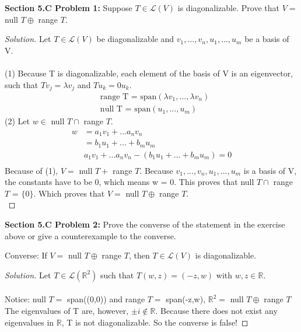 \documentclass[12pt]{article}
\begin{document}
\noindent \textbf{Section 5.C Problem 1: }Suppose $T \in \mathcal{L}(V)$ is diagonalizable. Prove that $V = $ null $T \oplus$ range $T$.
	\begin{proof}[Solution]
		Let $T \in \mathcal{L}(V)$ be diagonalizable and $v_1, ..., v_n, u_1 , ...,u_m$ be a basis of V.  
		\\ \\
		(1) Because T is diagonalizable, each element of the basis of V is an eigenvector, such that $Tv_j = \lambda v_j$ and $Tu_k = 0 u_k$.  
		\begin{align*}
			&\text{range T = span}(\lambda v_1 , ... , \lambda v_n) \\
			&\text{null T = span}(u_1 , ... , u_m) 
		\end{align*}
		(2) Let $w \in $ null $T \cap$ range $T$. 
		\begin{align*}
			w &= a_1 v_1 + ... a_n v_n \\
			&= b_1 u_1 + ... + b_m u_m \\
			&a_1 v_1 + ... a_n v_n - (b_1 u_1 + ... + b_m u_m) = 0 \\
		\end{align*}
		Because of (1), $V =$ null $T +$ range $T$. Because $v_1, ..., v_n, u_1 , ...,u_m$ is a basis of V, the constants have to be 0, which means w = 0.  This proves that null $T \cap$ range $T$ = $\{0\}$.  Which proves that $V = $ null $T \oplus$ range $T$. \\ 
	\end{proof}
\newpage

\noindent \textbf{Section 5.C Problem 2: }Prove the converse of the statement in the exercise above or give a
counterexample to the converse.
	\begin{center}
		Converse: If $V = $ null $T \oplus$ range $T$, then $T \in \mathcal{L}(V)$ is diagonalizable.
	\end{center}
	\begin{proof}[Solution]
		 Let $T \in \mathcal{L}(\mathbb{R}^2)$ such that $T(w,z) = (-z,w)$ with $w,z \in \mathbb{R}$. \\ \\
		 Notice: null $T =$ span((0,0)) and range $T = $ span(-z,w), $\mathbb{R}^2 =$ null $T \oplus$ range $T$  \\
		 The eigenvalues of T are, however, $\pm i \not \in \mathbb{R}$.  Because there does not exist any eigenvalues in $\mathbb{R}$, T is not diagonalizable. So the converse is false!
	\end{proof}






 
\end{document}
